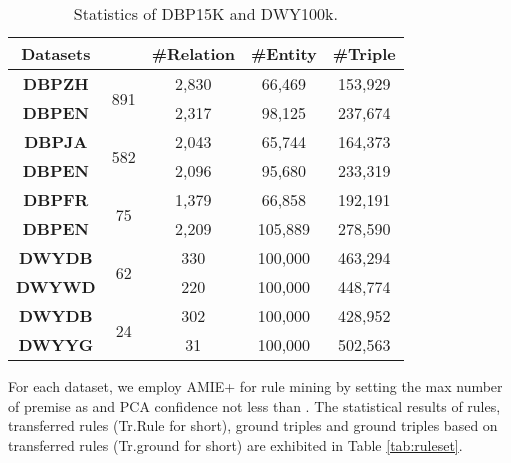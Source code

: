 \documentclass[11pt,a4paper]{article}
\begin{document}
\begin{table}[htbp]
	\centering
	\setlength{\tabcolsep}{1.0pt}
	\small
	\renewcommand{\arraystretch}{1.0}
	\begin{tabular}{ccccc}
		\toprule
		\textbf{Datasets}      &       & \#\textbf{Relation} & \#\textbf{Entity}  & \#\textbf{Triple}  \\
		\midrule
		\textbf{DBP{\tiny ZH}} & \multirow{2}[2]{*}{891 } & 2,830    & 66,469  & 153,929 \\
		\textbf{DBP{\tiny EN}} &                          & 2,317    & 98,125  & 237,674 \\
		\midrule
		\textbf{DBP{\tiny JA}} & \multirow{2}[2]{*}{582 } & 2,043    & 65,744  & 164,373 \\
		\textbf{DBP{\tiny EN}} &                          & 2,096    & 95,680  & 233,319 \\
		\midrule
		\textbf{DBP{\tiny FR}} & \multirow{2}[2]{*}{75 }  & 1,379    & 66,858  & 192,191 \\
		\textbf{DBP{\tiny EN}} &                          & 2,209    & 105,889 & 278,590 \\
		\midrule
		\textbf{DWY{\tiny DB}} & \multirow{2}[2]{*}{62 }  & 330      & 100,000 & 463,294 \\
		\textbf{DWY{\tiny WD}} &                          & 220      & 100,000 & 448,774 \\
		\midrule
		\textbf{DWY{\tiny DB}} & \multirow{2}[2]{*}{24 }  & 302      & 100,000 & 428,952 \\
		\textbf{DWY{\tiny YG}} &                          & 31       & 100,000 & 502,563 \\
		\bottomrule
	\end{tabular}\caption{Statistics of DBP15K and DWY100k.}
	\label{tab:dataset}\end{table}

For each dataset, we employ AMIE+ for rule mining by setting the max number of premise as  and PCA confidence not less than . The statistical results of rules, transferred rules (Tr.Rule for short), ground triples and ground triples based on transferred rules (Tr.ground for short) are exhibited in Table \ref{tab:ruleset}.
\end{document}
